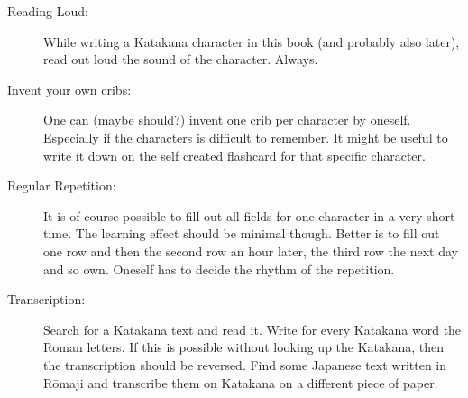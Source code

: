 \begin{description}

\item[Reading Loud:] While writing a Katakana character in this book (and
probably also later), read out loud the sound of the character. Always.

\item[Invent your own cribs:] One can (maybe should?) invent one crib per
character by oneself. Especially if the characters is difficult to remember. It
might be useful to write it down on the self created flashcard for that
specific character.

\item[Regular Repetition:] It is of course possible to fill out all fields
for one character in a very short time. The learning effect should be minimal
though. Better is to fill out one row and then the second row an hour later,
the third row the next day and so own. Oneself has to decide the rhythm of
the repetition.

\item[Transcription:]  Search for a  Katakana text and read it. Write for every
Katakana word the Roman letters. If this is possible without looking up the
Katakana, then the transcription should be reversed. Find some Japanese text
written in Rōmaji and transcribe them on Katakana on a different piece of
paper.

\end{description}

\newpage









